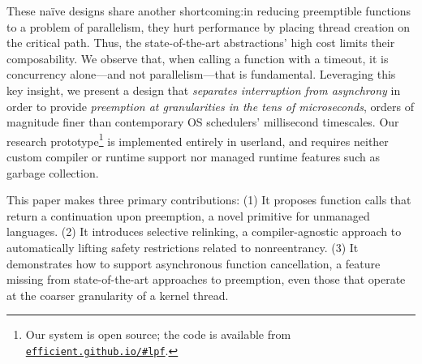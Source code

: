 These na\"ive designs share another shortcoming:\@ in reducing
preemptible functions to a problem of parallelism, they hurt performance by placing
thread creation on the critical path.  Thus, the state-of-the-art abstractions' high
cost limits their composability.  We observe that, when calling a function with
a timeout, it is concurrency alone---and not parallelism---that is fundamental.
Leveraging this key insight, we present a design that \textit{separates interruption
from asynchrony} in order to provide \textit{preemption at granularities in the tens
of microseconds}, orders of magnitude finer than contemporary OS schedulers'
millisecond timescales.  Our research prototype\footnote{Our system is open source;
the code is available from
\href{https://efficient.github.io/\#lpf}{\texttt{efficient.github.io/\#lpf}}.} is
implemented entirely in userland, and
requires neither custom compiler or runtime support nor managed runtime features such
as garbage collection.

This paper makes three primary contributions:  (1) It proposes function calls that
return a continuation upon preemption, a novel primitive for unmanaged languages.
(2) It introduces selective relinking, a compiler-agnostic approach to automatically
lifting safety restrictions related to nonreentrancy.  (3) It demonstrates how to
support asynchronous function cancellation, a feature missing from state-of-the-art
approaches to preemption, even those that operate at the coarser granularity of a
kernel thread.

